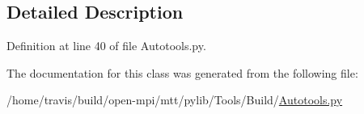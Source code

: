 \subsection{Detailed Description}


Definition at line 40 of file Autotools.\-py.



The documentation for this class was generated from the following file\-:\begin{DoxyCompactItemize}
\item 
/home/travis/build/open-\/mpi/mtt/pylib/\-Tools/\-Build/\hyperlink{_autotools_8py}{Autotools.\-py}\end{DoxyCompactItemize}
